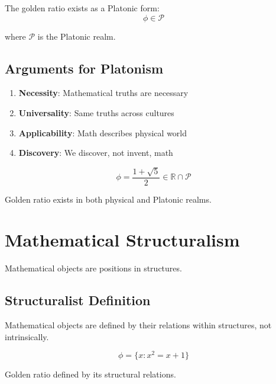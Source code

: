 \begin{theorem}
\label{thm:platonic-golden}
The golden ratio exists as a Platonic form:
\begin{equation}
\phi \in \mathcal{P}
\end{equation}

where $\mathcal{P}$ is the Platonic realm.
\end{theorem}

\subsection{Arguments for Platonism}

\begin{enumerate}
    \item \textbf{Necessity}: Mathematical truths are necessary
    \item \textbf{Universality}: Same truths across cultures
    \item \textbf{Applicability}: Math describes physical world
    \item \textbf{Discovery}: We discover, not invent, math
\end{enumerate}

\begin{proposition}
\label{prop:golden-platonism}
\begin{equation}
\phi = \frac{1+\sqrt{5}}{2} \in \mathbb{R} \cap \mathcal{P}
\end{equation}

Golden ratio exists in both physical and Platonic realms.
\end{proposition}

\section{Mathematical Structuralism}

Mathematical objects are positions in structures.

\subsection{Structuralist Definition}

\begin{definition}[Structuralism]
\label{def:structuralism}
Mathematical objects are defined by their relations within structures, not intrinsically.
\end{definition}

\begin{theorem}
\label{thm:golden-struct}
\begin{equation}
\phi = \{x : x^2 = x + 1\}
\end{equation}

Golden ratio defined by its structural relations.
\end{theorem}

